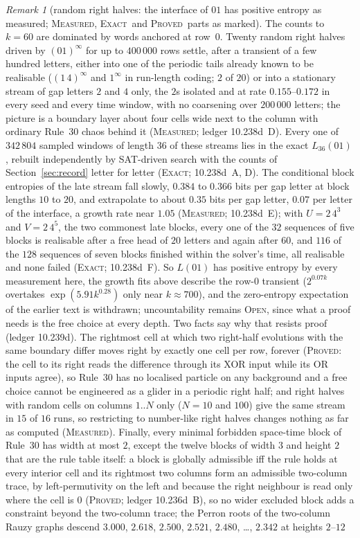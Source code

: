 \documentclass[11pt]{article}
\theoremstyle{definition}
\theoremstyle{remark}
\newtheorem{remark}[theorem]{Remark}
\newcommand{\PROVED}{\textsc{Proved}}
\newcommand{\EXACT}{\textsc{Exact}}
\newcommand{\MEASURED}{\textsc{Measured}}
\newcommand{\OPEN}{\textsc{Open}}
\begin{document}
\begin{remark}[random right halves: the interface of $01$ has positive entropy as measured; \MEASURED, \EXACT\ and \PROVED\ parts as marked]\label{ex:rem:stream}
The counts to $k=60$ are dominated by words anchored at row~$0$. Twenty random right halves driven by $(01)^\infty$ for up to $400\,000$ rows settle, after a transient of a few hundred letters, either into one of the periodic tails already known to be realisable ($(1\,4)^\infty$ and $1^\infty$ in run-length coding; $2$ of $20$) or into a stationary stream of gap letters $2$ and $4$ only, the $2$s isolated and at rate $0.155$--$0.172$ in every seed and every time window, with no coarsening over $200\,000$ letters; the picture is a boundary layer about four cells wide next to the column with ordinary Rule~30 chaos behind it (\MEASURED; ledger 10.238d~D). Every one of $342\,804$ sampled windows of length $36$ of these streams lies in the exact $L_{36}(01)$, rebuilt independently by SAT-driven search with the counts of Section~\ref{sec:record} letter for letter (\EXACT; 10.238d~A, D). The conditional block entropies of the late stream fall slowly, $0.384$ to $0.366$ bits per gap letter at block lengths $10$ to $20$, and extrapolate to about $0.35$ bits per gap letter, $0.07$ per letter of the interface, a growth rate near $1.05$ (\MEASURED; 10.238d~E); with $U=2\,4^{3}$ and $V=2\,4^{5}$, the two commonest late blocks, every one of the $32$ sequences of five blocks is realisable after a free head of $20$ letters and again after $60$, and $116$ of the $128$ sequences of seven blocks finished within the solver's time, all realisable and none failed (\EXACT; 10.238d~F). So $L(01)$ has positive entropy by every measurement here, the growth fits above describe the row-$0$ transient ($2^{0.07k}$ overtakes $\exp(5.91k^{0.28})$ only near $k\approx700$), and the zero-entropy expectation of the earlier text is withdrawn; uncountability remains \OPEN, since what a proof needs is the free choice at every depth. Two facts say why that resists proof (ledger 10.239d). The rightmost cell at which two right-half evolutions with the same boundary differ moves right by exactly one cell per row, forever (\PROVED: the cell to its right reads the difference through its XOR input while its OR inputs agree), so Rule~30 has no localised particle on any background and a free choice cannot be engineered as a glider in a periodic right half; and right halves with random cells on columns $1..N$ only ($N=10$ and $100$) give the same stream in $15$ of $16$ runs, so restricting to number-like right halves changes nothing as far as computed (\MEASURED). Finally, every minimal forbidden space-time block of Rule~30 has width at most $2$, except the twelve blocks of width $3$ and height $2$ that are the rule table itself: a block is globally admissible iff the rule holds at every interior cell and its rightmost two columns form an admissible two-column trace, by left-permutivity on the left and because the right neighbour is read only where the cell is $0$ (\PROVED; ledger 10.236d~B), so no wider excluded block adds a constraint beyond the two-column trace; the Perron roots of the two-column Rauzy graphs descend $3.000$, $2.618$, $2.500$, $2.521$, $2.480$, \dots, $2.342$ at heights $2$--$12$ 
\end{remark}
\end{document}
